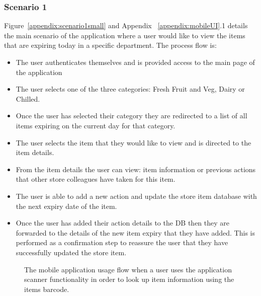 \documentclass[a4paper,11pt]{report}
\begin{document}
\subsubsection{Scenario 1}
Figure~\ref{appendix:scenario1small} and Appendix ~\ref{appendix:mobileUI}.1 details the main scenario of the application where a user would like to view the items that are expiring today in a specific department. The process flow is:
\begin{itemize}
    \item The user authenticates themselves and is provided access to the main page of the application
    \item The user selects one of the three categories: Fresh Fruit and Veg, Dairy or Chilled.
    \item Once the user has selected their category they are redirected to a list of all items expiring on the current day for that category.
    \item The user selects the item that they would like to view and is directed to the item details.
    \item From the item details the user can view: item information or previous actions that other store colleagues have taken for this item.
    \item The user is able to add a new action and update the store item database with the next expiry date of the item.
    \item Once the user has added their action details to the DB then they are forwarded to the details of the new item expiry that they have added. This is performed as a confirmation step to reassure the user that they have successfully updated the store item.
\end{itemize}

\begin{figure}[H]
    \centering
    \caption{The mobile application usage flow when a user uses the application scanner functionality in order to look up item information using the items barcode.}
    \label{appendix:scenario2small}
\end{figure}
\end{document}
